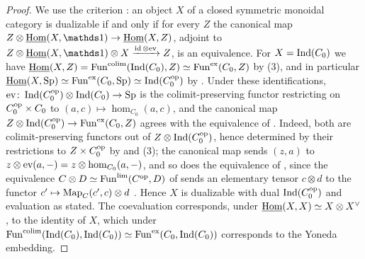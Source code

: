 	\begin{proof}
		We use the criterion \cite[Section~``Symmetric monoidal duality'']{Cnossen_StableHomotopy}: an object $X$ of a closed symmetric monoidal category is dualizable if and only if for every $Z$ the canonical map $Z \otimes \iHom(X,\unit) \to \iHom(X,Z)$, adjoint to $Z \otimes \iHom(X,\unit) \otimes X \xrightarrow{\id \otimes \ev} Z$, is an equivalence. For $X = \operatorname{Ind}(C_0)$ we have $\operatorname{\underline{\operatorname{Hom}}}(X,Z) = \operatorname{Fun}^{\operatorname{colim}}(\operatorname{Ind}(C_0),Z) \simeq \operatorname{Fun}^{\operatorname{ex}}(C_0,Z)$ by (3), and in particular $\operatorname{\underline{\operatorname{Hom}}}(X,{\textup{Sp}}) \simeq \operatorname{Fun}^{\operatorname{ex}}(C_0,{\textup{Sp}}) \simeq \operatorname{Ind}(C_0^{\textup{op}})$ by . Under these identifications, $\textup{ev}\colon \operatorname{Ind}(C_0^{\textup{op}}) \otimes \operatorname{Ind}(C_0) \to {\textup{Sp}}$ is the colimit-preserving functor restricting on $C_0^{\textup{op}} \times C_0$ to $(a,c) \mapsto \hom_{C_0}(a,c)$, and the canonical map $Z \otimes \operatorname{Ind}(C_0^{\textup{op}}) \to \operatorname{Fun}^{\operatorname{ex}}(C_0,Z)$ agrees with the equivalence of . Indeed, both are colimit-preserving functors out of $Z \otimes \operatorname{Ind}(C_0^{\textup{op}})$, hence determined by their restrictions to $Z \times C_0^{\textup{op}}$ by  and (3); the canonical map sends $(z,a)$ to $z \otimes \textup{ev}(a,-) = z \otimes \hom_{C_0}(a,-)$, and so does the equivalence of , since the equivalence $C \otimes D \simeq \operatorname{Fun}^{\operatorname{lim}}(C^{\textup{op}},D)$ of  sends an elementary tensor $c \otimes d$ to the functor $c' \mapsto \operatorname{Map}_C(c',c) \otimes d$ \cite[Proof of Proposition~4.8.1.17]{lurie2016HA}.
		Hence $X$ is dualizable with dual $\operatorname{Ind}(C_0^{\textup{op}})$ and evaluation as stated. The coevaluation corresponds, under $\operatorname{\underline{\operatorname{Hom}}}(X,X) \simeq X \otimes X^{\vee}$, to the identity of $X$, which under $\operatorname{Fun}^{\operatorname{colim}}(\operatorname{Ind}(C_0),\operatorname{Ind}(C_0)) \simeq \operatorname{Fun}^{\operatorname{ex}}(C_0,\operatorname{Ind}(C_0))$ corresponds to the Yoneda embedding.
	\end{proof}

